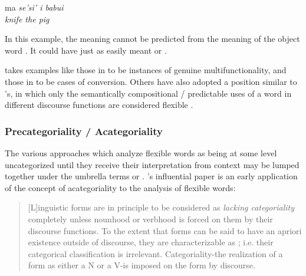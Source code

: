 \begin{exe}
  \ex\label{ex:2.6}
  \gll ma       \em{se'si'} i   babui\\
        \em{knife}  the pig\\
\end{exe}

\noindent In this example, the meaning  cannot be predicted from the meaning of the object word . It could have just as easily meant  or .

\citeauthor{Lier2012} takes examples like those in  to be instances of genuine multifunctionality, and those in  to be cases of conversion. Others have also adopted a position similar to \citeauthor{Lier2012}'s, in which only the semantically compositional / predictable uses of a word in different discourse functions are considered flexible \parencites[§2.2.2--§2.2.3]{Croft2001b}[§3.2]{EvansOsada2005}.

\subsubsection{Precategoriality / Acategoriality}
\label{sec:2.3.1.4}

The various approaches which analyze flexible words as being at some level uncategorized until they receive their interpretation from context may be lumped together under the umbrella terms  or . \citeauthor{HopperThompson1984}'s influential paper \citeyear{HopperThompson1984} is an early application of the concept of acategoriality to the analysis of flexible words:

\blockquote[{\cite[747]{HopperThompson1984}}]{[L]inguistic forms are in principle to be considered as \emph{lacking categoriality} completely unless nounhood or verbhood is forced on them by their discourse functions. To the extent that forms can be said to have an apriori existence outside of discourse, they are characterizable as ; i.e. their categorical classification is irrelevant. Categoriality-the realization of a form as either a N or a V-is imposed on the form by discourse.}

